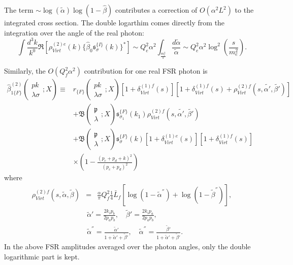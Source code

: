 The term $\sim\log(\widetilde{\alpha})\log(1-\widehat{\beta})$ contributes a correction of $O(\alpha^2L^2)$ to the integrated cross section. The double logarthim comes directly from the integration over the angle of the real photon:
\begin{equation}
\int\frac{d^3k}{k^0}\Re[\rho_{Virt}^{(2)e}(k)\{\hat{\beta}_0\mathfrak{s}^{\{I\}}_\sigma(k)\}^\ast]\sim Q^2_e\alpha^2\int_{\frac{m^2_e}{s}}\frac{d\widetilde{\alpha}}{\widetilde{\alpha}}\sim Q^2_e\alpha^2\log^2\left(\frac{s}{m^2_e}\right).
\end{equation}

Similarly, the $O(Q_f^2\alpha^2)$ contribution for one real FSR photon is 
\begin{align}
\hat{\beta}^{(2)}_{1\{F\}}\left(\begin{array}{c}
pk\\\lambda\sigma
\end{array};X\right)\equiv& r_{\{F\}}\left(\begin{array}{c}
pk\\\lambda\sigma
\end{array};X\right)[1+\delta_{Virt}^{(1)f}(s)][1+\delta_{Virt}^{(1)f}(s)+\rho_{Virt}^{(2)f}(s,\widetilde{\alpha'},\widetilde{\beta'})]\nonumber\\
&+\mathfrak{B}\left(\begin{array}{c}
\mathfrak{p}\\\lambda
\end{array};X\right)\mathfrak{s}^{\{F\}}_{\sigma_1}(k_1)\rho_{Virt}^{(2)f}(s,\widetilde{\alpha'},\widetilde{\beta'})\nonumber\\
&+\mathfrak{B}\left(\begin{array}{c}
\mathfrak{p}\\\lambda
\end{array};X\right)\mathfrak{s}^{\{F\}}_{\sigma}(k)[1+\delta_{Virt}^{(1)e}(s)][1+\delta_{Virt}^{(1)f}(s)]\nonumber\\
&\times\left(1-\frac{(p_c+p_d+k)^2}{(p_c+p_d)^2}\right)
\end{align}
where
\begin{eqnarray*}
\rho_{Virt}^{(2)f}(s,\widetilde{\alpha},\widetilde{\beta})&=&\frac{\alpha}{\pi}Q^2_f\frac{1}{4}\bar{L}_f[\log(1-\widetilde{\alpha}^{''})+\log(1-\widetilde{\beta}^{''})],
\end{eqnarray*}
\begin{align}
&\widetilde{\alpha}'=\frac{2k_ip_b}{2p_ap_b},\quad\widetilde{\beta}'=\frac{2k_ip_a}{2p_ap_b},\nonumber\\
&\widetilde{\alpha}^{''}=\frac{\widetilde{\alpha}'}{1+\widetilde{\alpha}'+\widetilde{\beta}'},\quad \widetilde{\alpha}^{''}=\frac{\widetilde{\beta}'}{1+\widetilde{\alpha}'+\widetilde{\beta}'}.
\end{align}
In the above FSR amplitudes averaged over the photon angles, only the double logarithmic part is kept.


